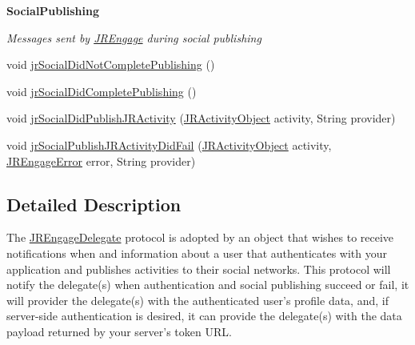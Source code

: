 \begin{Indent}{\bf SocialPublishing}\par
{\em \label{_amgrpeb046f03f7c48654b2974e7c81bd7f9b}
 Messages sent by \hyperlink{classcom_1_1janrain_1_1android_1_1engage_1_1_j_r_engage}{JREngage} during social publishing }\begin{DoxyCompactItemize}
\item 
void \hyperlink{interfacecom_1_1janrain_1_1android_1_1engage_1_1_j_r_engage_delegate_a5ef7762d503eb0f583d172d4a10f7869}{jrSocialDidNotCompletePublishing} ()
\item 
void \hyperlink{interfacecom_1_1janrain_1_1android_1_1engage_1_1_j_r_engage_delegate_afc069beff80daac09cc1e06566a45320}{jrSocialDidCompletePublishing} ()
\item 
void \hyperlink{interfacecom_1_1janrain_1_1android_1_1engage_1_1_j_r_engage_delegate_ace972ad01c27e01a5ccf27ad70a4d0d9}{jrSocialDidPublishJRActivity} (\hyperlink{classcom_1_1janrain_1_1android_1_1engage_1_1types_1_1_j_r_activity_object}{JRActivityObject} activity, String provider)
\item 
void \hyperlink{interfacecom_1_1janrain_1_1android_1_1engage_1_1_j_r_engage_delegate_a6abc64d6097987fd7e7d603b1b220650}{jrSocialPublishJRActivityDidFail} (\hyperlink{classcom_1_1janrain_1_1android_1_1engage_1_1types_1_1_j_r_activity_object}{JRActivityObject} activity, \hyperlink{classcom_1_1janrain_1_1android_1_1engage_1_1_j_r_engage_error}{JREngageError} error, String provider)
\end{DoxyCompactItemize}
\end{Indent}


\subsection{Detailed Description}
The \hyperlink{interfacecom_1_1janrain_1_1android_1_1engage_1_1_j_r_engage_delegate}{JREngageDelegate} protocol is adopted by an object that wishes to receive notifications when and information about a user that authenticates with your application and publishes activities to their social networks. This protocol will notify the delegate(s) when authentication and social publishing succeed or fail, it will provider the delegate(s) with the authenticated user's profile data, and, if server-\/side authentication is desired, it can provide the delegate(s) with the data payload returned by your server's token URL. 

